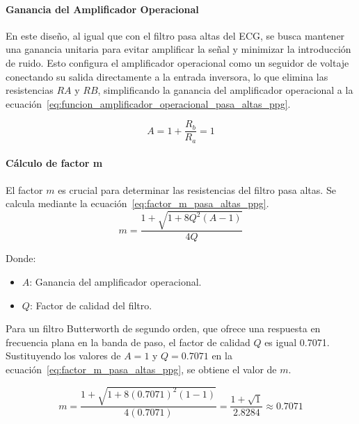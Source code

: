         \paragraph{Ganancia del Amplificador Operacional}
        En este diseño, al igual que con el filtro pasa altas del ECG, se busca mantener una ganancia unitaria para evitar amplificar la señal y minimizar la introducción de ruido. Esto configura el amplificador operacional como un seguidor de voltaje conectando su salida directamente a la entrada inversora, lo que elimina las resistencias $RA$ y $RB$, simplificando la ganancia del amplificador operacional a la ecuación~\ref{eq:funcion_amplificador_operacional_pasa_altas_ppg}.

        \begin{equation}
            \label{eq:funcion_amplificador_operacional_pasa_altas_ppg}
            A = 1 + \frac{R_b}{R_a} = 1
        \end{equation}

        \paragraph{Cálculo de factor m}
        El factor $m$ es crucial para determinar las resistencias del filtro pasa altas. Se calcula mediante la ecuación~\ref{eq:factor_m_pasa_altas_ppg}.
        \begin{equation}
            \label{eq:factor_m_pasa_altas_ppg}
            m = \frac{1+\sqrt{1+8Q^2(A-1)}}{4Q}
        \end{equation}

        Donde:

        \begin{itemize}
            \item $A$: Ganancia del amplificador operacional.
            \item $Q$: Factor de calidad del filtro.
        \end{itemize}

        Para un filtro Butterworth de segundo orden, que ofrece una respuesta en frecuencia plana en la banda de paso, el factor de calidad $Q$ es igual 0.7071. Sustituyendo los valores de $A = 1$ y $Q = 0.7071$ en la ecuación~\ref{eq:factor_m_pasa_altas_ppg}, se obtiene el valor de $m$.

        \begin{equation}
            \label{eq:factor_m_pasa_altas_ppg_valor}
            m = \frac{1+\sqrt{1+8(0.7071)^2(1-1)}}{4(0.7071)} = \frac{1 + \sqrt{1}}{2.8284}\approx 0.7071
        \end{equation}

